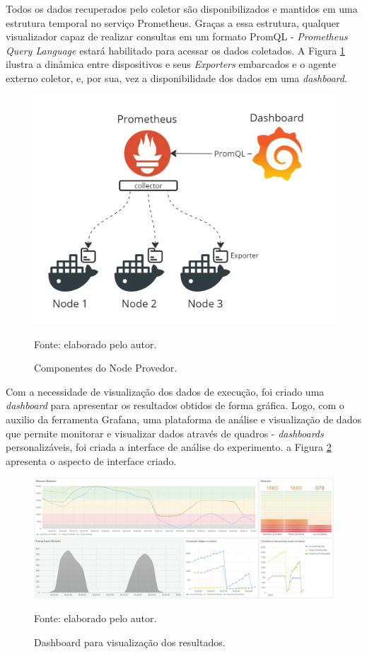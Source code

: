 Todos os dados recuperados pelo coletor são disponibilizados e mantidos em uma estrutura temporal no serviço Prometheus. Graças a essa estrutura, qualquer visualizador capaz de realizar consultas em um formato PromQL - \textit{Prometheus Query Language} estará habilitado para acessar os dados coletados. A Figura \ref{fig:cap6instrumentalizacao} ilustra a dinâmica entre dispositivos e seus \textit{Exporters} embarcados e o agente externo coletor, e, por sua, vez a disponibilidade dos dados em uma \textit{dashboard}. 

\begin{figure}[H]
	\centering
	
	\caption{Componentes do Node Provedor.}
	\label{fig:cap6instrumentalizacao}
	\noindent\includegraphics[width=0.75\linewidth]{Imagens/cap6/cap6instrumentalizacao.jpg} 
	
	Fonte: elaborado pelo autor.
\end{figure}


Com a necessidade de visualização dos dados de execução, foi criado uma \textit{dashboard}  para apresentar os resultados obtidos de forma gráfica. Logo, com o auxilio da ferramenta Grafana, uma plataforma de análise e visualização de dados que permite monitorar e visualizar dados através de quadros - \textit{dashboards} personalizáveis, foi criada a interface de análise do experimento. a Figura \ref{fig:cap6bashboard} apresenta o aspecto de interface criado.

\begin{figure}[H]
	\centering
	
	\caption{Dashboard para visualização dos resultados.}
	\label{fig:cap6bashboard}
	\noindent\includegraphics[width=1\linewidth]{Imagens/cap6/cap6dashboard.png} 
	
	Fonte: elaborado pelo autor.
\end{figure}

